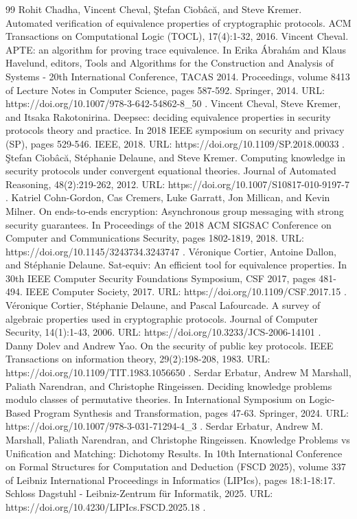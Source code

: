 \documentclass[10pt,a4paper]{amsart}
\begin{document}
\begin{thebibliography}{99}
 Rohit Chadha, Vincent Cheval, Ştefan Ciobâcă, and Steve Kremer. Automated verification of equivalence properties of cryptographic protocols. ACM Transactions on Computational Logic (TOCL), 17(4):1-32, 2016.
 Vincent Cheval. APTE: an algorithm for proving trace equivalence. In Erika Ábrahám and Klaus Havelund, editors, Tools and Algorithms for the Construction and Analysis of Systems - 20th International Conference, TACAS 2014. Proceedings, volume 8413 of Lecture Notes in Computer Science, pages 587-592. Springer, 2014. URL: https://doi.org/10.1007/978-3-642-54862-8\_50 .
 Vincent Cheval, Steve Kremer, and Itsaka Rakotonirina. Deepsec: deciding equivalence properties in security protocols theory and practice. In 2018 IEEE symposium on security and privacy (SP), pages 529-546. IEEE, 2018. URL: https://doi.org/10.1109/SP.2018.00033 .
 Ştefan Ciobâcă, Stéphanie Delaune, and Steve Kremer. Computing knowledge in security protocols under convergent equational theories. Journal of Automated Reasoning, 48(2):219-262, 2012. URL: https://doi.org/10.1007/S10817-010-9197-7 .
 Katriel Cohn-Gordon, Cas Cremers, Luke Garratt, Jon Millican, and Kevin Milner. On ends-to-ends encryption: Asynchronous group messaging with strong security guarantees. In Proceedings of the 2018 ACM SIGSAC Conference on Computer and Communications Security, pages 1802-1819, 2018. URL: https://doi.org/10.1145/3243734.3243747 .
 Véronique Cortier, Antoine Dallon, and Stéphanie Delaune. Sat-equiv: An efficient tool for equivalence properties. In 30th IEEE Computer Security Foundations Symposium, CSF 2017, pages 481-494. IEEE Computer Society, 2017. URL: https://doi.org/10.1109/CSF.2017.15 .
 Véronique Cortier, Stéphanie Delaune, and Pascal Lafourcade. A survey of algebraic properties used in cryptographic protocols. Journal of Computer Security, 14(1):1-43, 2006. URL: https://doi.org/10.3233/JCS-2006-14101 .
 Danny Dolev and Andrew Yao. On the security of public key protocols. IEEE Transactions on information theory, 29(2):198-208, 1983. URL: https://doi.org/10.1109/TIT.1983.1056650 .
 Serdar Erbatur, Andrew M Marshall, Paliath Narendran, and Christophe Ringeissen. Deciding knowledge problems modulo classes of permutative theories. In International Symposium on Logic-Based Program Synthesis and Transformation, pages 47-63. Springer, 2024. URL: https://doi.org/10.1007/978-3-031-71294-4\_3 .
 Serdar Erbatur, Andrew M. Marshall, Paliath Narendran, and Christophe Ringeissen. Knowledge Problems vs Unification and Matching: Dichotomy Results. In 10th International Conference on Formal Structures for Computation and Deduction (FSCD 2025), volume 337 of Leibniz International Proceedings in Informatics (LIPIcs), pages 18:1-18:17. Schloss Dagstuhl - Leibniz-Zentrum für Informatik, 2025. URL: https://doi.org/10.4230/LIPIcs.FSCD.2025.18 .

\end{thebibliography}
\end{document}
